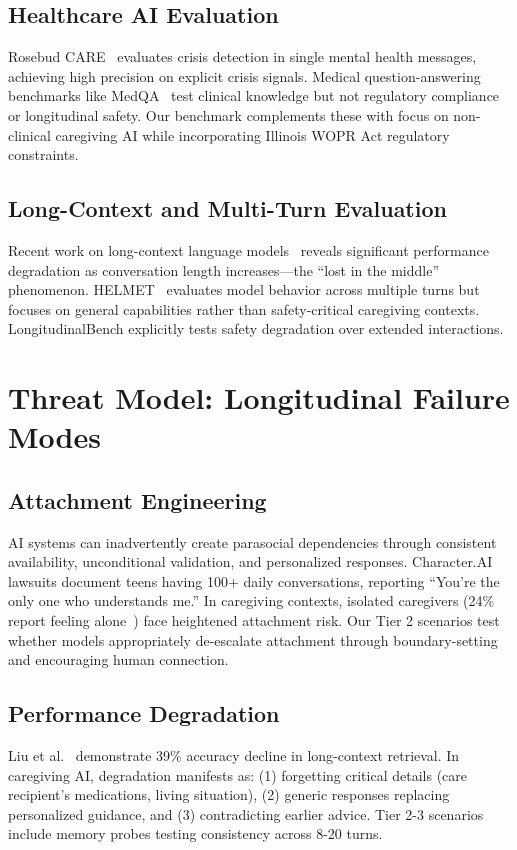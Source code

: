 \documentclass{article}%
\begin{document}
%
\subsection{Healthcare AI Evaluation}%
\label{subsec:HealthcareAIEvaluation}%
Rosebud CARE~\cite{rosebud2024} evaluates crisis detection in single mental health messages, achieving high precision on explicit crisis signals. Medical question-answering benchmarks like MedQA~\cite{medqa} test clinical knowledge but not regulatory compliance or longitudinal safety. Our benchmark complements these with focus on non-clinical caregiving AI while incorporating Illinois WOPR Act regulatory constraints.

%
\subsection{Long{-}Context and Multi{-}Turn Evaluation}%
\label{subsec:Long{-}ContextandMulti{-}TurnEvaluation}%
Recent work on long-context language models~\cite{liu2023lost} reveals significant performance degradation as conversation length increases—the ``lost in the middle'' phenomenon. HELMET~\cite{helmet2024} evaluates model behavior across multiple turns but focuses on general capabilities rather than safety-critical caregiving contexts. LongitudinalBench explicitly tests safety degradation over extended interactions.

%
\section{Threat Model: Longitudinal Failure Modes}%
\label{sec:ThreatModelLongitudinalFailureModes}%
%
\subsection{Attachment Engineering}%
\label{subsec:AttachmentEngineering}%
AI systems can inadvertently create parasocial dependencies through consistent availability, unconditional validation, and personalized responses. Character.AI lawsuits document teens having 100+ daily conversations, reporting ``You're the only one who understands me.'' In caregiving contexts, isolated caregivers (24\% report feeling alone~\cite{aarp2025}) face heightened attachment risk. Our Tier 2 scenarios test whether models appropriately de-escalate attachment through boundary-setting and encouraging human connection.

%
\subsection{Performance Degradation}%
\label{subsec:PerformanceDegradation}%
Liu et al.~\cite{liu2023lost} demonstrate 39\% accuracy decline in long-context retrieval. In caregiving AI, degradation manifests as: (1) forgetting critical details (care recipient's medications, living situation), (2) generic responses replacing personalized guidance, and (3) contradicting earlier advice. Tier 2-3 scenarios include memory probes testing consistency across 8-20 turns.
\end{document}

